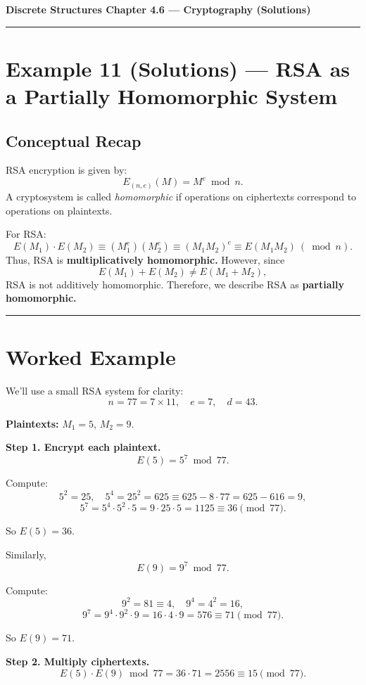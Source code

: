 \documentclass[12pt]{article}
\begin{document}
{\large \textbf{Discrete Structures \quad Chapter 4.6 — Cryptography (Solutions)}}

\hrule
\vspace{0.6em}

\section*{Example 11 (Solutions) — RSA as a Partially Homomorphic System}

\subsection*{Conceptual Recap}
RSA encryption is given by:
\[
E_{(n,e)}(M) = M^e \bmod n.
\]
A cryptosystem is called \emph{homomorphic} if operations on ciphertexts correspond to operations on plaintexts.

For RSA:
\[
E(M_1)\cdot E(M_2) \equiv (M_1^e)(M_2^e) \equiv (M_1M_2)^e \equiv E(M_1M_2)\ (\bmod n).
\]
Thus, RSA is \textbf{multiplicatively homomorphic.}  
However, since
\[
E(M_1) + E(M_2) \neq E(M_1 + M_2),
\]
RSA is not additively homomorphic.  
Therefore, we describe RSA as \textbf{partially homomorphic.}

\bigskip
\hrule
\vspace{0.5em}

\section*{Worked Example}

We’ll use a small RSA system for clarity:  
\[
n = 77 = 7 \times 11, \quad e = 7, \quad d = 43.
\]

\textbf{Plaintexts:} $M_1 = 5$, $M_2 = 9$.

\textbf{Step 1. Encrypt each plaintext.}
\[
E(5) = 5^7 \bmod 77.
\]

Compute:
\[
5^2 = 25,\quad 5^4 = 25^2 = 625 \equiv 625 - 8\cdot77 = 625 - 616 = 9,
\]
\[
5^7 = 5^4 \cdot 5^2 \cdot 5 = 9 \cdot 25 \cdot 5 = 1125 \equiv 36 \pmod{77}.
\]

So \(E(5)=36.\)

Similarly,
\[
E(9) = 9^7 \bmod 77.
\]

Compute:
\[
9^2 = 81 \equiv 4,\quad 9^4 = 4^2 = 16,
\]
\[
9^7 = 9^4 \cdot 9^2 \cdot 9 = 16 \cdot 4 \cdot 9 = 576 \equiv 71 \pmod{77}.
\]

So \(E(9)=71.\)

\textbf{Step 2. Multiply ciphertexts.}
\[
E(5)\cdot E(9) \bmod 77 = 36\cdot71 = 2556 \equiv 15 \pmod{77}.
\]
\end{document}
